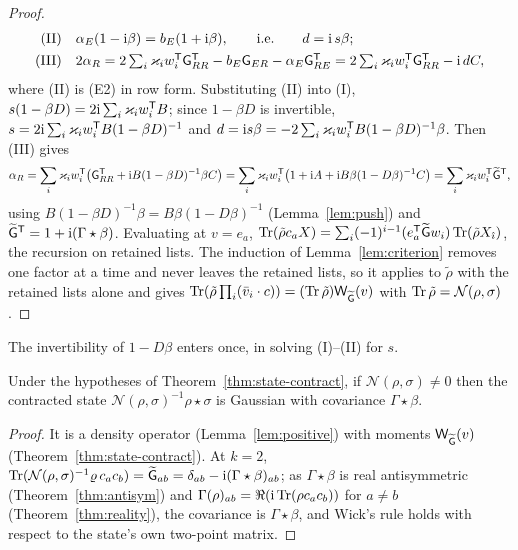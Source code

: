 \begin{proof}
\begin{align*}
 \text{(II)}\quad& \alpha_E(1-\mathrm i\beta)=b_E(1+\mathrm i\beta),\qquad\text{i.e.}\qquad d=\mathrm i\,s\beta;\\
 \text{(III)}\quad& 2\alpha_R=2\textstyle\sum_i\varkappa_iw_i^{\mathsf T}\mathsf G_{RR}^{\mathsf T}-b_E\mathsf G_{ER}-\alpha_E\mathsf G_{RE}^{\mathsf T}
 =2\sum_i\varkappa_iw_i^{\mathsf T}\mathsf G_{RR}^{\mathsf T}-\mathrm i\,dC,
\end{align*}
where (II) is (E2) in row form. Substituting (II) into (I), $s(1-\beta D)=2\mathrm i\sum_i\varkappa_iw_i^{\mathsf T}B$;
since $1-\beta D$ is invertible, $s=2\mathrm i\sum_i\varkappa_iw_i^{\mathsf T}B(1-\beta D)^{-1}$ and
$d=\mathrm i s\beta=-2\sum_i\varkappa_iw_i^{\mathsf T}B(1-\beta D)^{-1}\beta$. Then (III) gives
\[
 \alpha_R=\sum_i\varkappa_iw_i^{\mathsf T}\bigl(\mathsf G_{RR}^{\mathsf T}+\mathrm i B(1-\beta D)^{-1}\beta C\bigr)
 =\sum_i\varkappa_iw_i^{\mathsf T}\bigl(1+\mathrm i A+\mathrm i B\beta(1-D\beta)^{-1}C\bigr)=\sum_i\varkappa_iw_i^{\mathsf T}\widetilde{\mathsf G}^{\mathsf T},
\]
using $B(1-\beta D)^{-1}\beta=B\beta(1-D\beta)^{-1}$ (Lemma~\ref{lem:push}) and
$\widetilde{\mathsf G}^{\mathsf T}=1+\mathrm i(\Gamma\star\beta)$. Evaluating at $v=e_a$,
$\operatorname{Tr}(\tilde\rho c_aX)=\sum_i(-1)^{i-1}(e_a^{\mathsf T}\widetilde{\mathsf G} w_i)\operatorname{Tr}(\tilde\rho X_{\hat\imath})$, the recursion on
retained lists. The induction of Lemma~\ref{lem:criterion} removes one factor at a time and
never leaves the retained lists, so it applies to $\tilde\rho$ with the retained lists alone and gives
$\operatorname{Tr}(\tilde\rho\prod_i(\bar v_i\cdot c))=(\operatorname{Tr}\tilde\rho)\mathsf W_{\widetilde{\mathsf G}}(v)$ with $\operatorname{Tr}\tilde\rho=\mathcal N(\rho,\sigma)$.
\end{proof}
The invertibility of $1-D\beta$ enters once, in solving (I)--(II) for $s$.

\begin{corollary}\label{cor:contract-state}
Under the hypotheses of Theorem~\ref{thm:state-contract}, if $\mathcal N(\rho,\sigma)\neq0$ then the
contracted state $\mathcal N(\rho,\sigma)^{-1}\rho\star\sigma$ is Gaussian with covariance $\Gamma\star\beta$.
\end{corollary}
\begin{proof}
It is a density operator (Lemma~\ref{lem:positive}) with moments $\mathsf W_{\widetilde{\mathsf G}}(v)$
(Theorem~\ref{thm:state-contract}). At $k=2$, $\operatorname{Tr}(\mathcal N(\rho,\sigma)^{-1}\varrho\,c_ac_b)=\widetilde{\mathsf G}_{ab}
=\delta_{ab}-\mathrm i(\Gamma\star\beta)_{ab}$; as $\Gamma\star\beta$ is real antisymmetric
(Theorem~\ref{thm:antisym}) and $\Gamma(\rho)_{ab}=\Re(\mathrm i\operatorname{Tr}(\rho c_ac_b))$ for $a\neq b$
(Theorem~\ref{thm:reality}), the covariance is $\Gamma\star\beta$, and Wick's rule holds with
respect to the state's own two-point matrix.
\end{proof}

